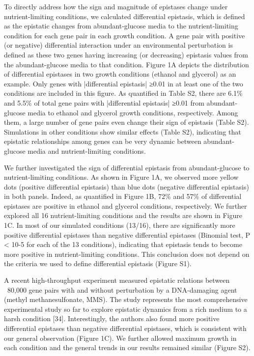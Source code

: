 To directly address how the sign and magnitude of epistases change
under nutrient-limiting conditions, we calculated differential
epistasis, which is defined as the epistatic changes from
abundant-glucose media to the nutrient-limiting condition for each
gene pair in each growth condition. A gene pair with positive (or
negative) differential interaction under an environmental perturbation
is defined as these two genes having increasing (or decreasing)
epistasis values from the abundant-glucose media to that
condition. Figure 1A depicts the distribution of differential
epistases in two growth conditions (ethanol and glycerol) as an
example. Only genes with |differential epistasis| ≥0.01 in at least
one of the two conditions are included in this figure. As quantified
in Table S2, there are 6.1\% and 5.5\% of total gene pairs with
|differential epistasis| ≥0.01 from abundant-glucose media to ethanol
and glycerol growth conditions, respectively. Among them, a large
number of gene pairs even change their sign of epistasis (Table
S2). Simulations in other conditions show similar effects (Table S2),
indicating that epistatic relationships among genes can be very
dynamic between abundant-glucose media and nutrient-limiting
conditions.

We further investigated the sign of differential epistasis from
abundant-glucose to nutrient-limiting conditions. As shown in Figure
1A, we observed more yellow dots (positive differential epistasis)
than blue dots (negative differential epistasis) in both
panels. Indeed, as quantified in Figure 1B, 72\% and 57\% of
differential epistases are positive in ethanol and glycerol
conditions, respectively. We further explored all 16 nutrient-limiting
conditions and the results are shown in Figure 1C. In most of our
simulated conditions (13/16), there are significantly more positive
differential epistases than negative differential epistases (Binomial
test, P < 10-5 for each of the 13 conditions), indicating that
epistasis tends to become more positive in nutrient-limiting
conditions. This conclusion does not depend on the criteria we used to
define differential epistasis (Figure S1).

A recent high-throughput experiment measured epistatic relations
between ~80,000 gene pairs with and without perturbation by a
DNA-damaging agent (methyl methanesulfonate, MMS). The study
represents the most comprehensive experimental study so far to explore
epistatic dynamics from a rich medium to a harsh condition
[34]. Interestingly, the authors also found more positive differential
epistases than negative differential epistases, which is consistent
with our general observation (Figure 1C). We further allowed maximum
growth in each condition and the general trends in our results
remained similar (Figure S2).

